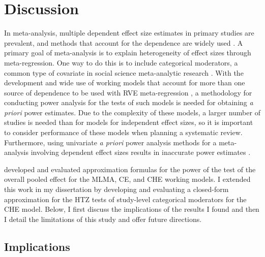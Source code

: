 \chapter{Discussion}\label{ch: discussion}

In meta-analysis, multiple dependent effect size estimates in primary studies are prevalent, and methods that account for the dependence are widely used \autocite{hedges2010, pustejovsky2022, vandennoortgate2013, vandennoortgate2015, betsy_jane_becker_model}. A primary goal of meta-analysis is to explain heterogeneity of effect sizes through meta-regression. One way to do this is to include categorical moderators, a common type of covariate in social science meta-analytic research \autocite{tipton2019a}. With the development and wide use of working models that account for more than one source of dependence to be used with RVE meta-regression \autocite{pustejovsky2022}, a methodology for conducting power analysis for the tests of such models is needed for obtaining \textit{a priori} power estimates. Due to the complexity of these models, a larger number of studies is needed than for models for independent effect sizes, so it is important to consider performance of these models when planning a systematic review. Furthermore, using univariate \textit{a priori} power analysis methods \autocite{hedges2001} for a meta-analysis involving dependent effect sizes results in inaccurate power estimates \autocite{vembye2023}.  

\textcite{vembye2023} developed and evaluated approximation formulas for the power of the test of the overall pooled effect for the MLMA, CE, and CHE working models. I extended this work in my dissertation by developing and evaluating a closed-form approximation for the HTZ tests of study-level categorical moderators for the CHE model.  Below, I first discuss the implications of the results I found and then I detail the limitations of this study and offer future directions. 


\section{Implications}



